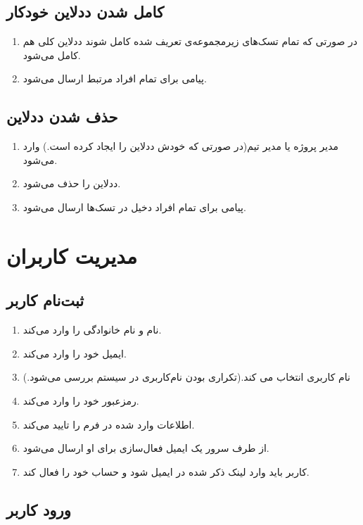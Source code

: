 \documentclass[10pt,a4paper]{article}
\begin{document}
\subsection{
	کامل شدن ددلاین خودکار
}
\begin{enumerate}
	\item 
	در صورتی که تمام تسک‌های زیرمجموعه‌ی تعریف شده کامل شوند ددلاین کلی هم کامل می‌شود.
	\item
	پیامی برای تمام افراد مرتبط ارسال می‌شود.
\end{enumerate}

\subsection{
	حذف شدن ددلاین
}
\begin{enumerate}
	\item 
	مدیر پروژه یا مدیر تیم(در صورتی که خودش ددلاین را ایجاد کرده است.) وارد می‌شود.
	\item
ددلاین  را حذف می‌شود.
	\item
	پیامی برای تمام افراد دخیل در تسک‌ها ارسال می‌شود.
\end{enumerate}


\section{
	مدیریت کاربران
}
\subsection{
ثبت‌نام کاربر
}
\begin{enumerate}
	\item 
نام و نام خانوادگی را وارد می‌کند.
\item
ایمیل خود را وارد می‌کند.
\item
نام کاربری انتخاب می کند.(تکراری بودن نام‌کاربری در سیستم بررسی می‌شود.)
\item
رمزعبور خود را وارد می‌کند.
\item
اطلاعات وارد شده در فرم را تایید می‌کند.
\item
از طرف سرور یک ایمیل فعال‌سازی برای او ارسال می‌شود.
\item
کاربر باید وارد لینک ذکر شده در ایمیل شود و حساب خود را فعال کند.
\end{enumerate}

\subsection{
ورود کاربر
}
\end{document}
